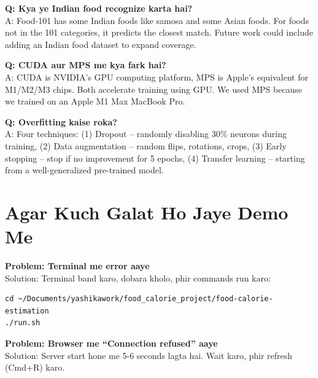 \documentclass[11pt,a4paper]{article}
\begin{document}
\begin{qabox}
\textbf{Q: Kya ye Indian food recognize karta hai?}\\[0.15cm]
A: Food-101 has some Indian foods like samosa and some Asian foods. For foods not in the 101 categories, it predicts the closest match. Future work could include adding an Indian food dataset to expand coverage.
\end{qabox}
\vspace{0.2cm}

\begin{qabox}
\textbf{Q: CUDA aur MPS me kya fark hai?}\\[0.15cm]
A: CUDA is NVIDIA's GPU computing platform, MPS is Apple's equivalent for M1/M2/M3 chips. Both accelerate training using GPU. We used MPS because we trained on an Apple M1 Max MacBook Pro.
\end{qabox}
\vspace{0.2cm}

\begin{qabox}
\textbf{Q: Overfitting kaise roka?}\\[0.15cm]
A: Four techniques: (1) Dropout -- randomly disabling 30\% neurons during training, (2) Data augmentation -- random flips, rotations, crops, (3) Early stopping -- stop if no improvement for 5 epochs, (4) Transfer learning -- starting from a well-generalized pre-trained model.
\end{qabox}

\section{Agar Kuch Galat Ho Jaye Demo Me}

\begin{warnbox}
\textbf{Problem: Terminal me error aaye}\\
Solution: Terminal band karo, dobara kholo, phir commands run karo:
\begin{verbatim}
cd ~/Documents/yashikawork/food_calorie_project/food-calorie-estimation
./run.sh
\end{verbatim}
\end{warnbox}

\begin{warnbox}
\textbf{Problem: Browser me ``Connection refused'' aaye}\\
Solution: Server start hone me 5-6 seconds lagta hai. Wait karo, phir refresh (Cmd+R) karo.
\end{warnbox}
\end{document}
